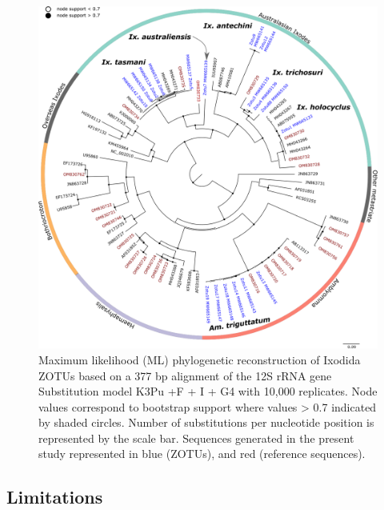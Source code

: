\documentclass[a4paper, nobind]{templates/ociamthesis}
\begin{document}
\begin{figure}
\includegraphics[width=0.95\linewidth]{figures/ms-figs/Ch2-12SNGStree} \caption[Phylogeny of tick species from wildlife.]{Maximum likelihood (ML) phylogenetic reconstruction of Ixodida ZOTUs based on a 377 bp alignment of the 12S rRNA gene Substitution model K3Pu +F + I + G4 with 10,000 replicates. Node values correspond to bootstrap support where values > 0.7 indicated by shaded circles. Number of substitutions per nucleotide position is represented by the scale bar. Sequences generated in the present study represented in blue (ZOTUs), and red (reference sequences).}\label{fig:F2NGStree}
\end{figure}

\hypertarget{limitations}{%
\subsection{Limitations}\label{limitations}}
\end{document}
